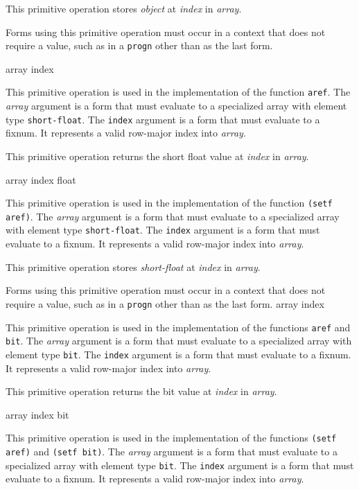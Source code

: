 This primitive operation stores \textit{object} at \textit{index} in
\textit{array}.

Forms using this primitive operation must occur in a context that does
not require a value, such as in a \texttt{progn} other than as the
last form.

 {array index}

This primitive operation is used in the implementation of the
\commonlisp{} function \texttt{aref}.  The \textit{array} argument is
a form that must evaluate to a specialized array with element type
\texttt{short-float}.  The \texttt{index} argument is a form that must
evaluate to a fixnum.  It represents a valid row-major index into
\textit{array}.

This primitive operation returns the short float value at
\textit{index} in \textit{array}.

 {array index float}

This primitive operation is used in the implementation of the
\commonlisp{} function \texttt{(setf aref)}.  The \textit{array}
argument is a form that must evaluate to a specialized array with
element type \texttt{short-float}.  The \texttt{index} argument is a
form that must evaluate to a fixnum.  It represents a valid row-major
index into \textit{array}.

This primitive operation stores \textit{short-float} at \textit{index}
in \textit{array}.

Forms using this primitive operation must occur in a context that does
not require a value, such as in a \texttt{progn} other than as the
last form.
 {array index}

This primitive operation is used in the implementation of the
\commonlisp{} functions \texttt{aref} and \texttt{bit}.  The
\textit{array} argument is a form that must evaluate to a specialized
array with element type \texttt{bit}.  The \texttt{index} argument is
a form that must evaluate to a fixnum.  It represents a valid
row-major index into \textit{array}.

This primitive operation returns the bit value at \textit{index} in
\textit{array}.

 {array index bit}

This primitive operation is used in the implementation of the
\commonlisp{} functions \texttt{(setf aref)} and \texttt{(setf bit)}.
The \textit{array} argument is a form that must evaluate to a
specialized array with element type \texttt{bit}.  The \texttt{index}
argument is a form that must evaluate to a fixnum.  It represents a
valid row-major index into \textit{array}.

